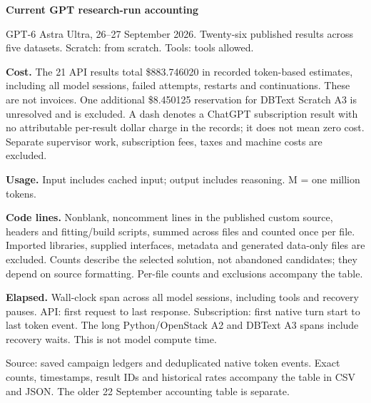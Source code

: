 \documentclass[10pt]{article}
\begin{document}
{\Large\bfseries Current GPT research-run accounting}\par
\vspace{3mm}
GPT-6 Astra Ultra, 26--27 September 2026. Twenty-six published results across
five datasets. Scratch: from scratch. Tools: tools allowed.\par
\vspace{5mm}

\vspace{4mm}

{\small
\textbf{Cost.} The 21 API results total \$883.746020 in recorded token-based
estimates, including all model sessions, failed attempts, restarts and continuations.
These are not invoices. One additional \$8.450125 reservation for DBText
Scratch A3 is unresolved and is excluded. A dash denotes a ChatGPT
subscription result with no attributable per-result dollar charge in the
records; it does not mean zero cost. Separate supervisor work, subscription
fees, taxes and machine costs are excluded.\par
\vspace{2mm}
\textbf{Usage.} Input includes cached input; output includes reasoning.
M = one million tokens.\par
\vspace{2mm}
\textbf{Code lines.} Nonblank, noncomment lines in the published custom source,
headers and fitting/build scripts, summed across files and counted once per file.
Imported libraries, supplied interfaces, metadata and generated data-only files
are excluded. Counts describe the selected solution, not abandoned candidates;
they depend on source formatting. Per-file counts and exclusions accompany the table.\par
\vspace{2mm}
\textbf{Elapsed.} Wall-clock span across all model sessions, including tools
and recovery pauses. API: first request to last response. Subscription:
first native turn start to last token event. The long Python/OpenStack A2
and DBText A3 spans include recovery waits. This is not model compute time.\par
\vspace{2mm}
Source: saved campaign ledgers and deduplicated native token events.
Exact counts, timestamps, result IDs and historical rates accompany the
table in CSV and JSON. The older 22 September accounting table is separate.
}
\end{document}
